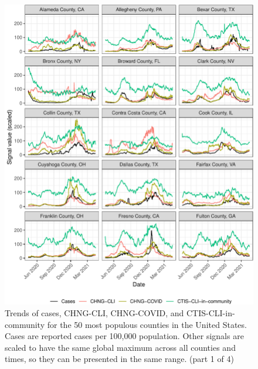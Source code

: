 \begin{figure}

{\centering \includegraphics[width=\textwidth]{fig/county-trend-grids-1-1}

}

\caption{Trends of cases, CHNG-CLI, CHNG-COVID, and CTIS-CLI-in-community for the 50 most populous counties in the United States. Cases are reported cases per 100,000 population. Other signals are scaled to have the same global maximum across all counties and times, so they can be presented in the same range. (part 1 of 4)}\label{fig:county-trend-grids-1}
\end{figure}

\clearpage

